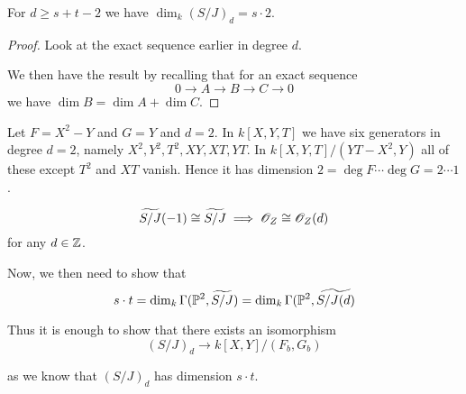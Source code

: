 \begin{lemma}
For $d\geq s+t-2$ we have $\dim_k(S/J)_d = s\cdot 2$. 
\end{lemma}
\begin{proof}
Look at the exact sequence earlier in degree $d$. 
\begin{center}
\end{center}
We then have the result by recalling that for an exact sequence
\begin{equation*}
    0\longrightarrow A\longrightarrow B\longrightarrow C\longrightarrow 0
\end{equation*}
we have $\dim B = \dim A+\dim C$. 
\end{proof}

\begin{example}
Let $F=X^2-Y$ and $G=Y$ and $d=2$. In $k[X, Y, T]$ we have six generators in degree $d=2$, namely $X^2, Y^2, T^2, XY, XT, YT$. In $k[X, Y, T]/(YT-X^2, Y)$ all of these except $T^2$ and $XT$ vanish. Hence it has dimension $2 = \deg F \cdots \deg G = 2\cdots 1$. 
\end{example}

\begin{corollary}
\begin{equation*}
    \widetilde{S/J}(-1) \cong \widetilde{S/J} \implies \O_Z \cong \O_Z(d)
\end{equation*}
for any $d\in \Z$. 
\end{corollary}

Now, we then need to show that
\begin{equation*}
    s\cdot t = \dim_k\Gamma(\P^2, \widetilde{S/J}) = \dim_k\Gamma(\P^2, \widetilde{S/J(d)}
\end{equation*}

Thus it is enough to show that there exists an isomorphism 
\begin{equation*}
    (S/J)_d \longrightarrow k[X, Y]/(F_b, G_b)
\end{equation*}

as we know that $(S/J)_d$ has dimension $s\cdot t$. 

